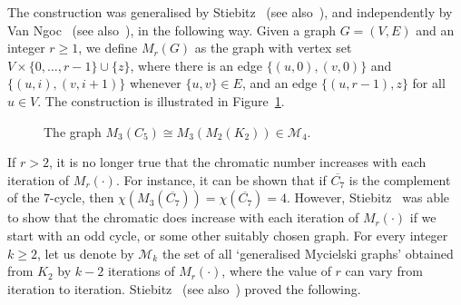 \documentclass[11pt,a4paper]{amsart}
\begin{document}
The construction was generalised by Stiebitz~\cite{Sti85} (see
also~\cite{SS89,GJS04}), and independently by Van Ngoc~\cite{Van87} (see also~\cite{VNT95}),
in the following way. Given a graph $G=(V,E)$
and an integer $r \geq 1$, we define $M_r(G)$
as the graph with vertex set $V \times \{0,\ldots,r-1\} \cup \{z\}$,
where there is an edge $\{(u,0),(v,0)\}$ and $\{(u,i),(v,i+1)\}$ whenever
$\{u,v\} \in E$, and an edge $\{(u,r-1),z\}$ for all $u \in V$.
The construction is illustrated in Figure~\ref{fig:gen-mycielski}.

\begin{figure}
\begin{center}
\end{center}
\caption{The graph $M_3(C_5) \cong M_3(M_2(K_2))\in \mathcal M_4$.}\label{fig:gen-mycielski}
\end{figure}

If $r>2$, it is no longer true that the chromatic number increases
with each iteration of $M_r(\cdot)$. For instance,
it can be shown that if $\overline{C_7}$ is the complement of the
$7$-cycle, then $\chi(M_3(\overline{C_7}))=\chi(\overline{C_7})=4$.
However, Stiebitz~\cite{Sti85} was able to show that the chromatic
does increase with each iteration of $M_r(\cdot)$ if we start with
an odd cycle, or some other suitably chosen graph.
For every integer $k \geq 2$, let us denote by $\mathcal M_k$ the
set of all `generalised Mycielski graphs' obtained from $K_2$ by
$k-2$ iterations of $M_r(\cdot)$, where the value of $r$ can
vary from iteration to iteration. Stiebitz~\cite{Sti85} (see
also~\cite{GJS04,Mat03}) proved the following.
\end{document}
